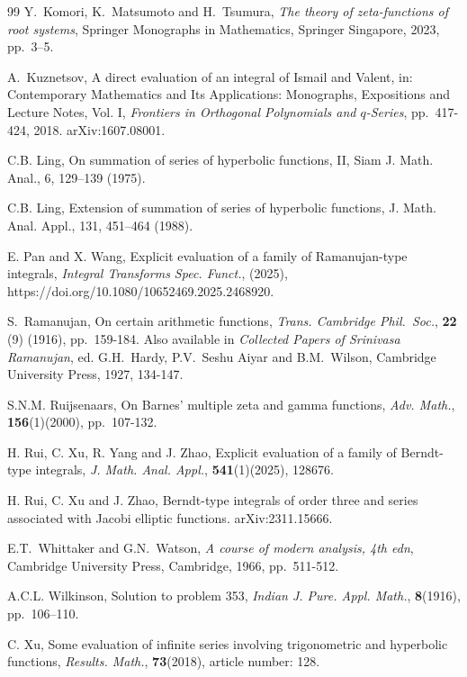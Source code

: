 \documentclass[11pt]{article}
\theoremstyle{plain}
\theoremstyle{definition}
\begin{document}
\begin{thebibliography}{99}
Y.\ Komori, K.\ Matsumoto and H.\ Tsumura, \emph{The theory of zeta-functions of root systems}, Springer Monographs in Mathematics, Springer Singapore, 2023, pp.\ 3--5.

A.\ Kuznetsov, A direct evaluation of an integral of Ismail and Valent, in: Contemporary Mathematics and Its Applications: Monographs, Expositions and Lecture Notes, Vol. I, \emph{Frontiers in Orthogonal Polynomials and $q$-Series}, pp.~417-424, 2018. arXiv:1607.08001.

C.B. Ling, On summation of series of hyperbolic functions, II, Siam J. Math. Anal., 6,
129–139 (1975).

 C.B. Ling, Extension of summation of series of hyperbolic functions, J. Math. Anal. Appl.,
131, 451–464 (1988).

E. Pan and X. Wang, Explicit evaluation of a family of Ramanujan-type integrals, \emph{Integral Transforms Spec. Funct.}, (2025), https://doi.org/10.1080/10652469.2025.2468920.

S.\ Ramanujan, On certain arithmetic functions, \emph{Trans. Cambridge Phil.\ Soc.}, \textbf{22} (9) (1916), pp.\ 159-184. Also available in \emph{Collected Papers of Srinivasa Ramanujan}, ed. G.H.\ Hardy, P.V.\ Seshu Aiyar and B.M.\ Wilson, Cambridge University Press, 1927, 134-147.

S.N.M. Ruijsenaars, On Barnes' multiple zeta and gamma functions, \emph{Adv. Math.}, \textbf{156}(1)(2000),  pp.\ 107-132.

H. Rui, C. Xu, R. Yang and J. Zhao, Explicit evaluation of a family of Berndt-type integrals, \emph{J. Math. Anal. Appl.}, \textbf{541}(1)(2025), 128676.

H. Rui, C. Xu and J. Zhao, Berndt-type integrals of order three and series associated with Jacobi elliptic functions. arXiv:2311.15666.

E.T.\ Whittaker and G.N.\ Watson, \emph{A course of modern analysis, 4th edn}, Cambridge University Press, Cambridge, 1966, pp.\ 511-512.

A.C.L. Wilkinson, Solution to problem 353, \emph{Indian J. Pure. Appl. Math.}, \textbf{8}(1916), pp.\ 106--110.

C. Xu, Some evaluation of infinite series involving trigonometric and hyperbolic functions, \emph{Results. Math.}, \textbf{73}(2018), article number: 128.


\end{thebibliography}
\end{document}
